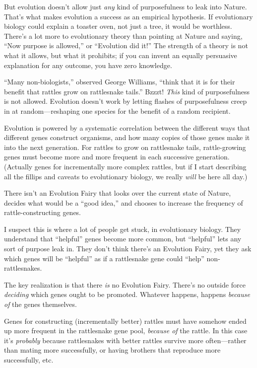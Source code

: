 {
 But evolution doesn't allow just \textit{any} kind
of purposefulness to leak into Nature. That's what
makes evolution a success as an empirical hypothesis. If evolutionary
biology could explain a toaster oven, not just a tree, it would be
worthless. There's a lot more to evolutionary theory
than pointing at Nature and saying, ``Now purpose is
allowed,'' or ``Evolution did
it!'' The strength of a theory is not what it allows,
but what it prohibits; if you can invent an equally persuasive
explanation for any outcome, you have zero knowledge.}

{
 ``Many non-biologists,''
observed George Williams, ``think that it is for their
benefit that rattles grow on rattlesnake
tails.'' Bzzzt! \textit{This} kind
of purposefulness is not allowed. Evolution doesn't
work by letting flashes of purposefulness creep in at
random---reshaping one species for the benefit of a random recipient.}

{
 Evolution is powered by a systematic correlation between the
different ways that different genes construct organisms, and how many
copies of those genes make it into the next generation. For rattles to
grow on rattlesnake tails, rattle-growing genes must become more and
more frequent in each successive generation. (Actually genes for
incrementally more complex rattles, but if I start describing all the
fillips and caveats to evolutionary biology, we really \textit{will} be
here all day.)}

{
 There isn't an Evolution Fairy that looks over the
current state of Nature, decides what would be a
``good idea,'' and chooses to
increase the frequency of rattle-constructing genes.}

{
 I suspect this is where a lot of people get stuck, in evolutionary
biology. They understand that
``helpful'' genes become more
common, but ``helpful'' lets any
sort of purpose leak in. They don't think
there's an Evolution Fairy, yet they ask which genes
will be ``helpful'' as if a
rattlesnake gene could ``help''
non-rattlesnakes.}

{
 The key realization is that there \textit{is} no Evolution Fairy.
There's no outside force \textit{deciding} which genes
ought to be promoted. Whatever happens, happens \textit{because of} the
genes themselves.}

{
 Genes for constructing (incrementally better) rattles must have
somehow ended up more frequent in the rattlesnake gene pool,
\textit{because of} the rattle. In this case it's
\textit{probably} because rattlesnakes with better rattles survive more
often---rather than mating more successfully, or having brothers that
reproduce more successfully, etc.}

